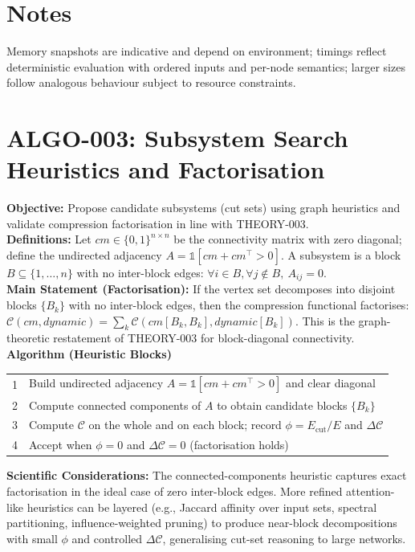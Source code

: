 \documentclass{article}
\begin{document}
\section{Notes}
Memory snapshots are indicative and depend on environment; timings reflect deterministic evaluation with ordered inputs and per-node semantics; larger sizes follow analogous behaviour subject to resource constraints.

\section{ALGO-003: Subsystem Search Heuristics and Factorisation}
\textbf{Objective:} Propose candidate subsystems (cut sets) using graph heuristics and validate compression factorisation in line with THEORY-003.\\
\textbf{Definitions:} Let \(cm\in\{0,1\}^{n\times n}\) be the connectivity matrix with zero diagonal; define the undirected adjacency \(A=\mathbb{1}[cm+cm^\top>0]\). A subsystem is a block \(B\subseteq\{1,\dots,n\}\) with no inter-block edges: \(\forall i\in B,\forall j\notin B,\ A_{ij}=0\).\\
\textbf{Main Statement (Factorisation):} If the vertex set decomposes into disjoint blocks \(\{B_k\}\) with no inter-block edges, then the compression functional factorises: \(\mathcal{C}(cm, dynamic)=\sum_k \mathcal{C}(cm[B_k,B_k], dynamic[B_k])\). This is the graph-theoretic restatement of THEORY-003 for block-diagonal connectivity.\\
\textbf{Algorithm (Heuristic Blocks)}\\
\begin{center}
\begin{tabular}{ll}
\toprule
\midrule
1 & Build undirected adjacency \(A=\mathbb{1}[cm+cm^\top>0]\) and clear diagonal \\
2 & Compute connected components of \(A\) to obtain candidate blocks \(\{B_k\}\) \\
3 & Compute \(\mathcal{C}\) on the whole and on each block; record \(\phi=E_{\mathrm{cut}}/E\) and \(\Delta \mathcal{C}\) \\
4 & Accept when \(\phi=0\) and \(\Delta \mathcal{C}=0\) (factorisation holds) \\
\bottomrule
\end{tabular}
\end{center}
\textbf{Scientific Considerations:} The connected-components heuristic captures exact factorisation in the ideal case of zero inter-block edges. More refined attention-like heuristics can be layered (e.g., Jaccard affinity over input sets, spectral partitioning, influence-weighted pruning) to produce near-block decompositions with small \(\phi\) and controlled \(\Delta \mathcal{C}\), generalising cut-set reasoning to large networks.\\
\end{document}
